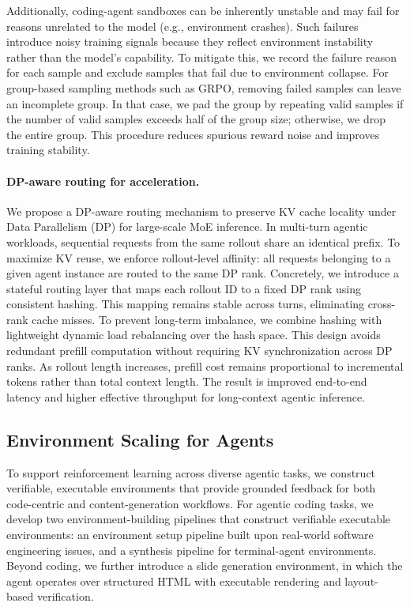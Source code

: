 Additionally, coding-agent sandboxes can be inherently unstable and may fail for reasons unrelated to the model (e.g., environment crashes). Such failures introduce noisy training signals because they reflect environment instability rather than the model’s capability. To mitigate this, we record the failure reason for each sample and exclude samples that fail due to environment collapse. For group-based sampling methods such as GRPO, removing failed samples can leave an incomplete group. In that case, we pad the group by repeating valid samples if the number of valid samples exceeds half of the group size; otherwise, we drop the entire group. This procedure reduces spurious reward noise and improves training stability.


\paragraph{DP-aware routing for acceleration.}
We propose a DP-aware routing mechanism to preserve KV cache locality under Data Parallelism (DP) for large-scale MoE inference. In multi-turn agentic workloads, sequential requests from the same rollout share an identical prefix. To maximize KV reuse, we enforce rollout-level affinity: all requests belonging to a given agent instance are routed to the same DP rank. Concretely, we introduce a stateful routing layer that maps each rollout ID to a fixed DP rank using consistent hashing. This mapping remains stable across turns, eliminating cross-rank cache misses. To prevent long-term imbalance, we combine hashing with lightweight dynamic load rebalancing over the hash space. This design avoids redundant prefill computation without requiring KV synchronization across DP ranks. As rollout length increases, prefill cost remains proportional to incremental tokens rather than total context length. The result is improved end-to-end latency and higher effective throughput for long-context agentic inference.



\subsection{Environment Scaling for Agents}

To support reinforcement learning across diverse agentic tasks, we construct verifiable, executable environments that provide grounded feedback for both code-centric and content-generation workflows.
For agentic coding tasks, we develop two environment-building pipelines that construct verifiable executable environments: an environment setup pipeline built upon real-world software engineering issues, and a synthesis pipeline for terminal-agent environments.
Beyond coding, we further introduce a slide generation environment, in which the agent operates over structured HTML with executable rendering and layout-based verification.

